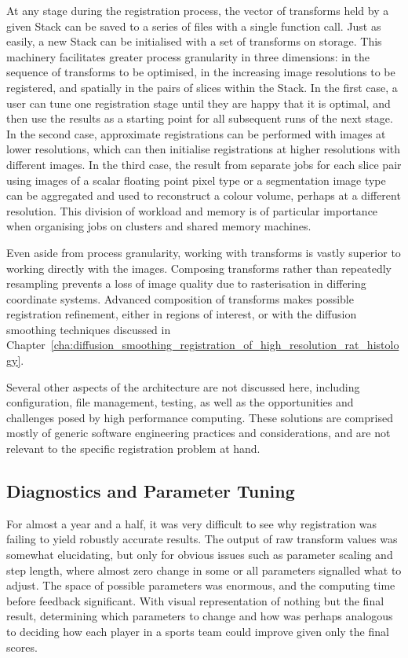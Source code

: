       At any stage during the registration process, the vector of transforms held by a given Stack can be saved to a series of files with a single function call. Just as easily, a new Stack can be initialised with a set of transforms on storage. This machinery facilitates greater process granularity in three dimensions: in the sequence of transforms to be optimised, in the increasing image resolutions to be registered, and spatially in the pairs of slices within the Stack. In the first case, a user can tune one registration stage until they are happy that it is optimal, and then use the results as a starting point for all subsequent runs of the next stage. In the second case, approximate registrations can be performed with images at lower resolutions, which can then initialise registrations at higher resolutions with different images. In the third case, the result from separate jobs for each slice pair using images of a scalar floating point pixel type or a segmentation image type can be aggregated and used to reconstruct a colour volume, perhaps at a different resolution. This division of workload and memory is of particular importance when organising jobs on clusters and shared memory machines.
			
			Even aside from process granularity, working with transforms is vastly superior to working directly with the images. Composing transforms rather than repeatedly resampling prevents a loss of image quality due to rasterisation in differing coordinate systems. Advanced composition of transforms makes possible registration refinement, either in regions of interest, or with the diffusion smoothing techniques discussed in Chapter~\ref{cha:diffusion_smoothing_registration_of_high_resolution_rat_histology}.
          
      Several other aspects of the architecture are not discussed here, including configuration, file management, testing, as well as the opportunities and challenges posed by high performance computing. These solutions are comprised mostly of generic software engineering practices and considerations, and are not relevant to the specific registration problem at hand.
		
  
  \subsection{Diagnostics and Parameter Tuning} %
    \label{sub:diagnostics}
      For almost a year and a half, it was very difficult to see why registration was failing to yield robustly accurate results. The output of raw transform values was somewhat elucidating, but only for obvious issues such as parameter scaling and step length, where almost zero change in some or all parameters signalled what to adjust. The space of possible parameters was enormous, and the computing time before feedback significant. With visual representation of nothing but the final result, determining which parameters to change and how was perhaps analogous to deciding how each player in a sports team could improve given only the final scores.
      

